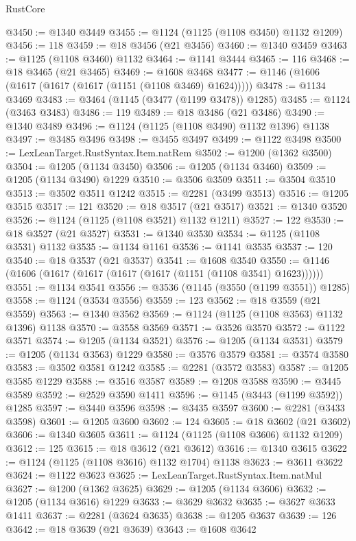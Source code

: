 \begin{lexlean}{RustCore}
\begin{coremodule}
@3450 := @1340 @3449
@3455 := @1124 (@1125 (@1108 @3450) @1132 @1209)
@3456 := 118
@3459 := @18 @3456 (@21 @3456)
@3460 := @1340 @3459
@3463 := @1125 (@1108 @3460) @1132
@3464 := @1141 @3444
@3465 := 116
@3468 := @18 @3465 (@21 @3465)
@3469 := @1608 @3468
@3477 := @1146 (@1606 (@1617 (@1617 (@1617 (@1151 (@1108 @3469) @1624)))))
@3478 := @1134 @3469
@3483 := @3464 (@1145 (@3477 (@1199 @3478)) @1285)
@3485 := @1124 (@3463 @3483)
@3486 := 119
@3489 := @18 @3486 (@21 @3486)
@3490 := @1340 @3489
@3496 := @1124 (@1125 (@1108 @3490) @1132 @1396) @1138
@3497 := @3485 @3496
@3498 := @3455 @3497
@3499 := @1122 @3498
@3500 := LexLeanTarget.RustSyntax.Item.natRem
@3502 := @1200 (@1362 @3500)
@3504 := @1205 (@1134 @3450)
@3506 := @1205 (@1134 @3460)
@3509 := @1205 (@1134 @3490) @1229
@3510 := @3506 @3509
@3511 := @3504 @3510
@3513 := @3502 @3511 @1242
@3515 := @2281 (@3499 @3513)
@3516 := @1205 @3515
@3517 := 121
@3520 := @18 @3517 (@21 @3517)
@3521 := @1340 @3520
@3526 := @1124 (@1125 (@1108 @3521) @1132 @1211)
@3527 := 122
@3530 := @18 @3527 (@21 @3527)
@3531 := @1340 @3530
@3534 := @1125 (@1108 @3531) @1132
@3535 := @1134 @1161
@3536 := @1141 @3535
@3537 := 120
@3540 := @18 @3537 (@21 @3537)
@3541 := @1608 @3540
@3550 := @1146 (@1606 (@1617 (@1617 (@1617 (@1617 (@1151 (@1108 @3541) @1623))))))
@3551 := @1134 @3541
@3556 := @3536 (@1145 (@3550 (@1199 @3551)) @1285)
@3558 := @1124 (@3534 @3556)
@3559 := 123
@3562 := @18 @3559 (@21 @3559)
@3563 := @1340 @3562
@3569 := @1124 (@1125 (@1108 @3563) @1132 @1396) @1138
@3570 := @3558 @3569
@3571 := @3526 @3570
@3572 := @1122 @3571
@3574 := @1205 (@1134 @3521)
@3576 := @1205 (@1134 @3531)
@3579 := @1205 (@1134 @3563) @1229
@3580 := @3576 @3579
@3581 := @3574 @3580
@3583 := @3502 @3581 @1242
@3585 := @2281 (@3572 @3583)
@3587 := @1205 @3585 @1229
@3588 := @3516 @3587
@3589 := @1208 @3588
@3590 := @3445 @3589
@3592 := @2529 @3590 @1411
@3596 := @1145 (@3443 (@1199 @3592)) @1285
@3597 := @3440 @3596
@3598 := @3435 @3597
@3600 := @2281 (@3433 @3598)
@3601 := @1205 @3600
@3602 := 124
@3605 := @18 @3602 (@21 @3602)
@3606 := @1340 @3605
@3611 := @1124 (@1125 (@1108 @3606) @1132 @1209)
@3612 := 125
@3615 := @18 @3612 (@21 @3612)
@3616 := @1340 @3615
@3622 := @1124 (@1125 (@1108 @3616) @1132 @1704) @1138
@3623 := @3611 @3622
@3624 := @1122 @3623
@3625 := LexLeanTarget.RustSyntax.Item.natMul
@3627 := @1200 (@1362 @3625)
@3629 := @1205 (@1134 @3606)
@3632 := @1205 (@1134 @3616) @1229
@3633 := @3629 @3632
@3635 := @3627 @3633 @1411
@3637 := @2281 (@3624 @3635)
@3638 := @1205 @3637
@3639 := 126
@3642 := @18 @3639 (@21 @3639)
@3643 := @1608 @3642

\end{coremodule}
\end{lexlean}

